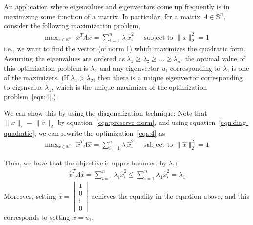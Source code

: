 \documentclass[12pt]{article}
\begin{document}
An application where eigenvalues and eigenvectors come up frequently
is in maximizing some function of a matrix.  In particular, for a
matrix $A \in \mathbb{S}^n$, consider the following maximization
problem, 
\begin{align}\mathrm{max}_{x \in \mathbb{R}^n} \;\; x^T A x = \sum_{i=1}^n \lambda_i\hat{x}_i^2  \;\;\;\;\;
\mbox{subject to } \|x\|_2^2 = 1\label{eqn:4}
\end{align}
i.e., we want to find the vector (of norm 1) which maximizes the
quadratic form.  Assuming the eigenvalues are ordered as $\lambda_1
\geq \lambda_2 \geq \ldots \geq \lambda_n$, the optimal value of this optimization problem is $\lambda_1$ and any eigenvector $u_1$ corresponding to $\lambda_1$ is one of the maximizers. (If $\lambda_1 > \lambda_2$, then there is a unique eigenvector corresponding to eigenvalue $\lambda_1$, which is the unique maximizer of the optimization problem~\eqref{eqn:4}.)

We can show this by using the diagonalization technique: Note that $\|x\|_2 = \|\hat{x}\|_2$ by equation~\eqref{eqn:preserve-norm}, and using equation~\eqref{eqn:diag-quadratic}, we can rewrite the optimization~\eqref{eqn:4} as
\begin{align}
\mathrm{max}_{\hat{x} \in \mathbb{R}^n} \;\; \hat{x}^T \Lambda \hat{x} = \sum_{i=1}^n \lambda_i\hat{x}_i^2 \;\;\;\;\;
\mbox{subject to } \|\hat{x}\|_2^2 = 1\label{eqn:5}
\end{align}


Then, we have that the objective is upper bounded by $\lambda_1$:
\begin{align}
\hat{x}^T \Lambda \hat{x} = \sum_{i=1}^n \lambda_i\hat{x}_i^2 \le \sum_{i=1}^n \lambda_1 \hat{x}_i^2  = \lambda_1
\end{align}
Moreover, setting $\hat{x} = \left [ \begin{array}{c} 1 \\ 0\\ \vdots \\ 0  \end{array} \right ]$ achieves the equality in the equation above, and this corresponds to setting $x = u_1$. 
\end{document}
